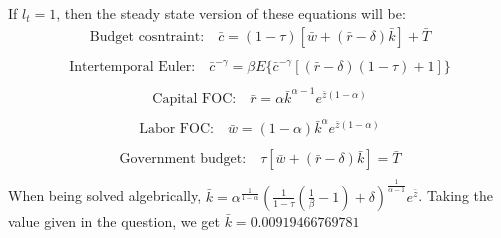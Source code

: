 \documentclass[letterpaper,12pt]{article}
\theoremstyle{definition}
\begin{document}
\begin{enumerate}
\begin{equation}
	\end{equation}
	If $l_{t} = 1$, then the steady state version of these equations will be: \\
	\begin{equation} \label{eq1}
	\begin{split}
	\text{Budget cosntraint:} \quad \bar{c} = (1 - \tau)[\bar{w} + (\bar{r} - \delta)\bar{k}] + \bar{T}\\
	\end{split}
	\end{equation}
	\begin{equation} \label{eq2}
	\begin{split}
	\text{Intertemporal Euler:} \quad \bar{c}^{-\gamma} = \beta E\{  \bar{c}^{-\gamma}[(\bar{r} - \delta)(1 - \tau) + 1]\} \\
	\end{split}
	\end{equation}
	\begin{equation} \label{eq3}
	\begin{split}
	\text{Capital FOC:} \quad \bar{r} = \alpha \bar{k}^{\alpha - 1} e^{\bar{z}(1 - \alpha)} \\
	\end{split}
	\end{equation}
	\begin{equation} \label{eq4}
	\begin{split}
	\text{Labor FOC:} \quad \bar{w} = (1 - \alpha)\bar{k}^{\alpha} e^{\bar{z}(1 - \alpha)} \\
	\end{split}
	\end{equation}
	\begin{equation} \label{eq5}
	\begin{split}
	\text{Government budget:} \quad \tau[\bar{w} + (\bar{r} - \delta)\bar{k}] = \bar{T}  \\
	\end{split}
	\end{equation}
	When being solved algebrically, $\bar{k} =\alpha^{\frac{1}{1 - \alpha}}(\frac{1}{1 - \tau}(\frac{1}{\beta} - 1) + \delta)^{\frac{1}{\alpha - 1}} e^{\bar{z}}$. Taking the value given in the question, we get $\bar{k} = 0.00919466769781$\\
	

\end{enumerate}

\vspace{25mm}
\end{document}
